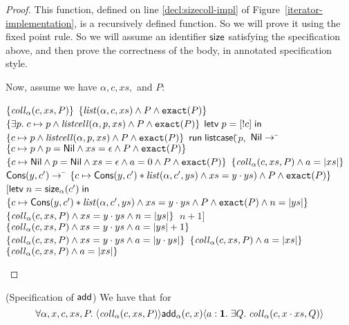 \begin{proof}
This function, defined on line \ref{decl:sizecoll-impl} of Figure~\ref{iterator-implementation},
is a recursively defined function. So we will prove it using the fixed point rule. So we 
will assume an identifier $\mathsf{size}$ satisfying the specification above, and then prove
the correctness of the body, in annotated specification style. 

Now, assume we have $\alpha, c, xs,$ and $P$: 

\begin{specification}
\nextline $\{{\mathit{coll}_\alpha(c, xs, P)}\}$ 
\nextline $\{{\mathit{list}(\alpha, c, xs) \land P \land \mathtt{exact}({P})}\}$ 
\nextline $\{{\exists p.\; c \mapsto p \land \mathit{listcell}(\alpha, p, xs) \land P \land \mathtt{exact}({P})}\}$ 
\nextline $\mathsf{letv}\;p = [!c]\;\mathsf{in}\;$
\nextline $\{{c \mapsto p \land \mathit{listcell}(\alpha, p, xs) \land P \land \mathtt{exact}({P})}\}$ 
\nextline $\mathsf{run}\;\mathsf{listcase}($\=$p,$ 
\nextline \> $\mathsf{Nil} \to $
\nextline \> \qquad \=$\{{c \mapsto p \land p = \mathsf{Nil} \land xs = \epsilon \land P \land \mathtt{exact}({P})}\}$ 
\nextline \> \> 
\nextline \> \> $\{{c \mapsto \mathsf{Nil} \land p = \mathsf{Nil} \land xs = \epsilon \land a = 0 \land P \land \mathtt{exact}({P})}\}$ 
\nextline \> \> $\{{\mathit{coll}_\alpha(c, xs, P) \land a = |xs|}\}$ 
\nextline \> $\mathsf{Cons}(y, c') \to $ 
\nextline \> \qquad \= $\{{c \mapsto \mathsf{Cons}(y, c') * \mathit{list}(\alpha, c', ys) \land xs = y\cdot ys) \land P \land \mathtt{exact}({P})}\}$ 
\nextline \> \> $[\mathsf{letv}\;n = \mathsf{size}_\alpha(c')\;\mathsf{in}\;$
\nextline \> \> \,$\{{c \mapsto \mathsf{Cons}(y, c') * \mathit{list}(\alpha, c', ys) \land xs = y\cdot ys \land P \land \mathtt{exact}({P}) \land n = |ys|}\}$ 
\nextline \> \> \,$\{{\mathit{coll}_\alpha(c, xs, P) \land xs = y\cdot ys \land n = |ys|}\}$ 
\nextline \> \> \,$n+1]$
\nextline \> \> $\{{\mathit{coll}_\alpha(c, xs, P) \land xs = y\cdot ys \land a = |ys| + 1}\}$ 
\nextline \> \> $\{{\mathit{coll}_\alpha(c, xs, P) \land xs = y\cdot ys \land a = |y\cdot ys|}\}$ 
\nextline \> \> $\{{\mathit{coll}_\alpha(c, xs, P) \land a = |xs|}\}$ 
\nextline $\{{\mathit{coll}_\alpha(c, xs, P) \land a = |xs|}\}$ 
\end{specification}
\end{proof}

\begin{lemma}{(Specification of $\mathsf{add}$)}
We have that for 
\begin{displaymath}
  \forall \alpha, x, c, xs, P.\; \langle{\mathit{coll}_\alpha(c, xs, P)}\rangle{\mathsf{add}_\alpha(c, x)}\langle{a:\mathbf{1}}.\;{\exists Q.\; \mathit{coll}_\alpha(c, x\cdot xs, Q)}\rangle
\end{displaymath}
\end{lemma}

